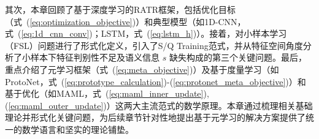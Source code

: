 其次，本章回顾了基于深度学习的RATR框架，包括优化目标（式~(\ref{eq:optimization_objective})）和典型模型（如1D-CNN，式~(\ref{eq:1d_cnn_conv})；LSTM，式~(\ref{eq:lstm_h})）。接着，对小样本学习（FSL）问题进行了形式化定义，引入了S/Q Training范式，并从特征空间角度分析了小样本下特征判别性不足及语义信息 $s$ 缺失构成的第三个关键问题。最后，重点介绍了元学习框架（式~(\ref{eq:meta_objective})）及基于度量学习（如ProtoNet，式~(\ref{eq:prototype_calculation})-(\ref{eq:protonet_meta_objective})）和基于优化（如MAML，式~(\ref{eq:maml_inner_update}), (\ref{eq:maml_outer_update})）这两大主流范式的数学原理。本章通过梳理相关基础理论并形式化关键问题，为后续章节针对性地提出基于元学习的解决方案提供了统一的数学语言和坚实的理论铺垫。